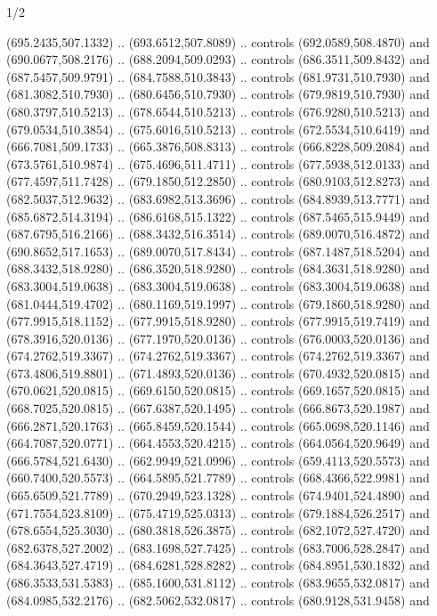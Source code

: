\begin{flagdescription}{1/2}
\begin{scope}[xshift=0.5\flaglength,yshift=0.5\flagwidth,scale=\flagwidth/759]
\begin{scope}[y=0.8pt, x=0.8pt, yscale=-1,shift={(-720,-480)}]
\begin{scope}[cm={{1.14637,0.0,0.0,1.17117,(33.17849,82.1384)}}]
  (695.2435,507.1332) .. (693.6512,507.8089) .. controls (692.0589,508.4870) and
  (690.0677,508.2176) .. (688.2094,509.0293) .. controls (686.3511,509.8432) and
  (687.5457,509.9791) .. (684.7588,510.3843) .. controls (681.9731,510.7930) and
  (681.3082,510.7930) .. (680.6456,510.7930) .. controls (679.9819,510.7930) and
  (680.3797,510.5213) .. (678.6544,510.5213) .. controls (676.9280,510.5213) and
  (679.0534,510.3854) .. (675.6016,510.5213) .. controls (672.5534,510.6419) and
  (666.7081,509.1733) .. (665.3876,508.8313) .. controls (666.8228,509.2084) and
  (673.5761,510.9874) .. (675.4696,511.4711) .. controls (677.5938,512.0133) and
  (677.4597,511.7428) .. (679.1850,512.2850) .. controls (680.9103,512.8273) and
  (682.5037,512.9632) .. (683.6982,513.3696) .. controls (684.8939,513.7771) and
  (685.6872,514.3194) .. (686.6168,515.1322) .. controls (687.5465,515.9449) and
  (687.6795,516.2166) .. (688.3432,516.3514) .. controls (689.0070,516.4872) and
  (690.8652,517.1653) .. (689.0070,517.8434) .. controls (687.1487,518.5204) and
  (688.3432,518.9280) .. (686.3520,518.9280) .. controls (684.3631,518.9280) and
  (683.3004,519.0638) .. (683.3004,519.0638) .. controls (683.3004,519.0638) and
  (681.0444,519.4702) .. (680.1169,519.1997) .. controls (679.1860,518.9280) and
  (677.9915,518.1152) .. (677.9915,518.9280) .. controls (677.9915,519.7419) and
  (678.3916,520.0136) .. (677.1970,520.0136) .. controls (676.0003,520.0136) and
  (674.2762,519.3367) .. (674.2762,519.3367) .. controls (674.2762,519.3367) and
  (673.4806,519.8801) .. (671.4893,520.0136) .. controls (670.4932,520.0815) and
  (670.0621,520.0815) .. (669.6150,520.0815) .. controls (669.1657,520.0815) and
  (668.7025,520.0815) .. (667.6387,520.1495) .. controls (666.8673,520.1987) and
  (666.2871,520.1763) .. (665.8459,520.1544) .. controls (665.0698,520.1146) and
  (664.7087,520.0771) .. (664.4553,520.4215) .. controls (664.0564,520.9649) and
  (666.5784,521.6430) .. (662.9949,521.0996) .. controls (659.4113,520.5573) and
  (660.7400,520.5573) .. (664.5895,521.7789) .. controls (668.4366,522.9981) and
  (665.6509,521.7789) .. (670.2949,523.1328) .. controls (674.9401,524.4890) and
  (671.7554,523.8109) .. (675.4719,525.0313) .. controls (679.1884,526.2517) and
  (678.6554,525.3030) .. (680.3818,526.3875) .. controls (682.1072,527.4720) and
  (682.6378,527.2002) .. (683.1698,527.7425) .. controls (683.7006,528.2847) and
  (684.3643,527.4719) .. (684.6281,528.8282) .. controls (684.8951,530.1832) and
  (686.3533,531.5383) .. (685.1600,531.8112) .. controls (683.9655,532.0817) and
  (684.0985,532.2176) .. (682.5062,532.0817) .. controls (680.9128,531.9458) and

\end{scope}
\end{scope}
\end{scope}
\end{flagdescription}
